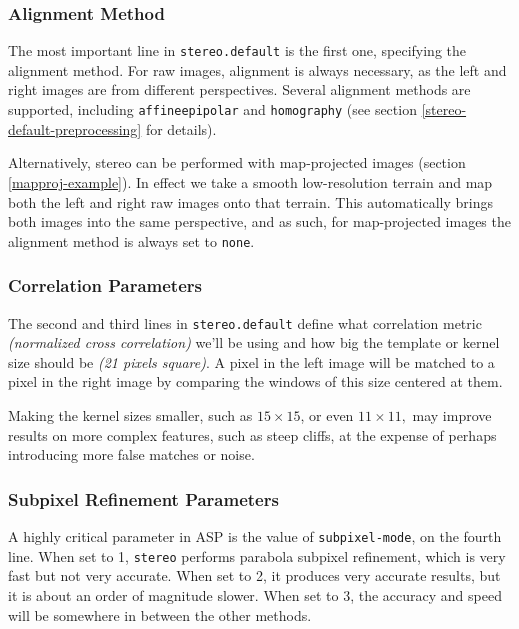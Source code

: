 \subsubsection*{Alignment Method}

The most important line in \texttt{stereo.default} is the
first one, specifying the alignment method. For raw images, alignment is
always necessary, as the left and right images are from different
perspectives. Several alignment methods are supported, including
\texttt{affineepipolar} and \texttt{homography} (see section
\ref{stereo-default-preprocessing} for details).

Alternatively, stereo can be performed with map-projected images
(section \ref{mapproj-example}). In effect we take a smooth
low-resolution terrain and map both the left and right raw images onto
that terrain. This automatically brings both images into the same
perspective, and as such, for map-projected images the alignment method
is always set to \texttt{none}.

\subsubsection*{Correlation Parameters}

The second and third lines in \texttt{stereo.default} define what
correlation metric \textit{(normalized cross correlation)} we'll be
using and how big the template or kernel size should be \textit{(21
pixels square)}. A pixel in the left image will be matched to a pixel in
the right image by comparing the windows of this size centered at them.

Making the kernel sizes smaller, such as $15 \times 15$, or even $11
\times 11,$ may improve results on more complex features, such as steep
cliffs, at the expense of perhaps introducing more false matches or
noise.

\subsubsection*{Subpixel Refinement Parameters}

A highly critical parameter in \ac{ASP} is the value of
\texttt{subpixel-mode}, on the fourth line. When set to 1,
\texttt{stereo} performs parabola subpixel refinement, which is very
fast but not very accurate. When set to 2, it produces very accurate
results, but it is about an order of magnitude slower. When set to 3,
the accuracy and speed will be somewhere in between the other methods.

